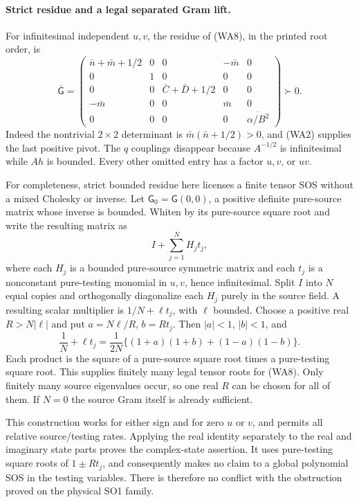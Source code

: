 \paragraph{Strict residue and a legal separated Gram lift.}
For infinitesimal independent $u,v$, the residue of (WA8), in the
printed root order, is
\[
 \overline{\mathsf G}=
 \begin{pmatrix}
 \bar n+\bar m+1/2&0&0&-\bar m&0\\
 0&1&0&0&0\\
 0&0&\bar C+\bar D+1/2&0&0\\
 -\bar m&0&0&\bar m&0\\
 0&0&0&0&\overline{\alpha/B^2}
 \end{pmatrix}\succ0.                                \tag{WA9}
\]
Indeed the nontrivial $2\times2$ determinant is
$\bar m(\bar n+1/2)>0$, and (WA2) supplies the last positive
pivot. The $q$ couplings disappear because $A^{-1/2}$ is
infinitesimal while $Ah$ is bounded. Every other omitted entry
has a factor $u,v$, or $uv$.

For completeness, strict bounded residue here licenses a finite
tensor SOS without a mixed Cholesky or inverse. Let
$\mathsf G_0=\mathsf G(0,0)$, a positive definite pure-source
matrix whose inverse is bounded. Whiten by its pure-source square
root and write the resulting matrix as
\[
 I+\sum_{j=1}^N H_j t_j,
\]
where each $H_j$ is a bounded pure-source symmetric matrix and
each $t_j$ is a nonconstant pure-testing monomial in $u,v$, hence
infinitesimal. Split $I$ into $N$ equal copies and orthogonally
diagonalize each $H_j$ purely in the source field. A resulting
scalar multiplier is $1/N+\ell t_j$, with $\ell$ bounded.
Choose a positive real $R>N|\ell|$ and put
$a=N\ell/R$, $b=Rt_j$. Then $|a|<1$, $|b|<1$, and
\[
 \frac1N+\ell t_j
 =\frac1{2N}\{(1+a)(1+b)+(1-a)(1-b)\}.               \tag{WA10}
\]
Each product is the square of a pure-source square root times
a pure-testing square root. This supplies finitely many legal
tensor roots for (WA8). Only finitely many source eigenvalues
occur, so one real $R$ can be chosen for all of them. If $N=0$
the source Gram itself is already sufficient.

This construction works for either sign and for zero $u$ or $v$,
and permits all relative source/testing rates. Applying the real
identity separately to the real and imaginary state parts proves
the complex-state assertion. It uses pure-testing square roots of
$1\pm Rt_j$, and consequently makes no claim to a global
polynomial SOS in the testing variables. There is therefore no
conflict with the obstruction proved on the physical SO1 family.

